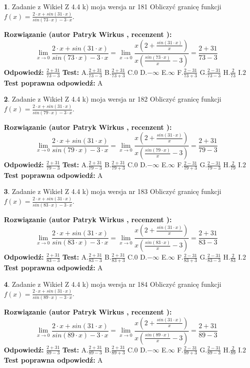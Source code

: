 \documentclass[12pt, a4paper]{article}
\theoremstyle{definition} %
\newtheorem{zad}{}
\newcommand{\zadStart}[1]{\begin{zad}#1\newline}
\newcommand{\zadStop}{\end{zad}}
\newcommand{\rozwStart}[2]{\noindent \textbf{Rozwiązanie (autor #1 , recenzent #2): }\newline}
\newcommand{\rozwStop}{\newline}
\newcommand{\odpStart}{\noindent \textbf{Odpowiedź:}\newline}
\newcommand{\odpStop}{\newline}
\newcommand{\testStart}{\noindent \textbf{Test:}\newline}
\newcommand{\testStop}{\newline}
\newcommand{\kluczStart}{\noindent \textbf{Test poprawna odpowiedź:}\newline}
\newcommand{\kluczStop}{\newline}
\begin{document}
\zadStart{Zadanie z Wikieł Z 4.4 k) moja wersja nr 181}
Obliczyć granicę funkcji $f(x)=\frac{2\cdot x +sin(31\cdot x)}{sin(73\cdot x) -3\cdot x}$.
\zadStop
\rozwStart{Patryk Wirkus}{}
$$\lim\limits_{x\to 0}\frac{2\cdot x +sin(31\cdot x)}{sin(73\cdot x) -3\cdot x}
=\lim\limits_{x\to 0}\frac{x(2+\frac{sin(31\cdot x)}{x})}{x(\frac{sin(73\cdot x)}{x}-3)}
=\frac{2+31}{73-3}$$
\rozwStop
\odpStart
$\frac{2+31}{73-3}$
\odpStop
\testStart
A.$\frac{2+31}{73-3}$
B.$\frac{2+31}{73+3}$
C.$0$
D.$-\infty$
E.$\infty$
F.$\frac{2-31}{73+3}$
G.$\frac{2-31}{73-3}$
H.$\frac{2}{73}$
I.$2$
\testStop
\kluczStart
A
\kluczStop



\zadStart{Zadanie z Wikieł Z 4.4 k) moja wersja nr 182}
Obliczyć granicę funkcji $f(x)=\frac{2\cdot x +sin(31\cdot x)}{sin(79\cdot x) -3\cdot x}$.
\zadStop
\rozwStart{Patryk Wirkus}{}
$$\lim\limits_{x\to 0}\frac{2\cdot x +sin(31\cdot x)}{sin(79\cdot x) -3\cdot x}
=\lim\limits_{x\to 0}\frac{x(2+\frac{sin(31\cdot x)}{x})}{x(\frac{sin(79\cdot x)}{x}-3)}
=\frac{2+31}{79-3}$$
\rozwStop
\odpStart
$\frac{2+31}{79-3}$
\odpStop
\testStart
A.$\frac{2+31}{79-3}$
B.$\frac{2+31}{79+3}$
C.$0$
D.$-\infty$
E.$\infty$
F.$\frac{2-31}{79+3}$
G.$\frac{2-31}{79-3}$
H.$\frac{2}{79}$
I.$2$
\testStop
\kluczStart
A
\kluczStop



\zadStart{Zadanie z Wikieł Z 4.4 k) moja wersja nr 183}
Obliczyć granicę funkcji $f(x)=\frac{2\cdot x +sin(31\cdot x)}{sin(83\cdot x) -3\cdot x}$.
\zadStop
\rozwStart{Patryk Wirkus}{}
$$\lim\limits_{x\to 0}\frac{2\cdot x +sin(31\cdot x)}{sin(83\cdot x) -3\cdot x}
=\lim\limits_{x\to 0}\frac{x(2+\frac{sin(31\cdot x)}{x})}{x(\frac{sin(83\cdot x)}{x}-3)}
=\frac{2+31}{83-3}$$
\rozwStop
\odpStart
$\frac{2+31}{83-3}$
\odpStop
\testStart
A.$\frac{2+31}{83-3}$
B.$\frac{2+31}{83+3}$
C.$0$
D.$-\infty$
E.$\infty$
F.$\frac{2-31}{83+3}$
G.$\frac{2-31}{83-3}$
H.$\frac{2}{83}$
I.$2$
\testStop
\kluczStart
A
\kluczStop



\zadStart{Zadanie z Wikieł Z 4.4 k) moja wersja nr 184}
Obliczyć granicę funkcji $f(x)=\frac{2\cdot x +sin(31\cdot x)}{sin(89\cdot x) -3\cdot x}$.
\zadStop
\rozwStart{Patryk Wirkus}{}
$$\lim\limits_{x\to 0}\frac{2\cdot x +sin(31\cdot x)}{sin(89\cdot x) -3\cdot x}
=\lim\limits_{x\to 0}\frac{x(2+\frac{sin(31\cdot x)}{x})}{x(\frac{sin(89\cdot x)}{x}-3)}
=\frac{2+31}{89-3}$$
\rozwStop
\odpStart
$\frac{2+31}{89-3}$
\odpStop
\testStart
A.$\frac{2+31}{89-3}$
B.$\frac{2+31}{89+3}$
C.$0$
D.$-\infty$
E.$\infty$
F.$\frac{2-31}{89+3}$
G.$\frac{2-31}{89-3}$
H.$\frac{2}{89}$
I.$2$
\testStop
\kluczStart
A
\kluczStop
\end{document}
